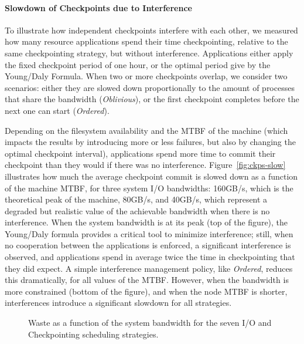 \documentclass[conference,nofonttune]{IEEEtran}
\newcommand{\nocoop}{\emph{Oblivious}\xspace}
\newcommand{\fifoblock}{\emph{Ordered}\xspace}
\begin{document}
\paragraph{Slowdown of Checkpoints due to Interference}
To illustrate how independent checkpoints interfere with each other,
we measured how many resource applications spend their time
checkpointing, relative to the same checkpointing strategy, but
without interference. Applications either apply the fixed checkpoint
period of one hour, or the optimal period give by the Young/Daly
Formula. When two or more checkpoints overlap, we consider two
scenarios: either they are slowed down proportionally to the amount of
processes that share the bandwidth (\nocoop), or the first checkpoint
completes before the next one can start (\fifoblock).

Depending on the filesystem availability and the MTBF of the machine
(which impacts the results by introducing more or less failures, but
also by changing the optimal checkpoint interval), applications spend
more time to commit their checkpoint than they would if there was no
interference. Figure~\ref{fig:ckps-slow} illustrates how much
the average checkpoint commit is slowed down as a function of the
machine MTBF, for three system I/O bandwidths: 160GB/s, which is the
theoretical peak of the machine, 80GB/s, and 40GB/s, which represent a
degraded but realistic value of the achievable bandwidth when there is
no interference.  When the system bandwidth is at its peak
(top of the figure), the Young/Daly formula
provides a critical tool to minimize interference; still, when no
cooperation between the applications is enforced, a significant
interference is observed, and applications spend in average twice the
time in checkpointing that they did expect. A simple interference
management policy, like \fifoblock, reduces this dramatically, for all
values of the MTBF.  However, when the bandwidth is more constrained
(bottom of the figure), and when the node MTBF is
shorter, interferences introduce a significant slowdown for all
strategies.

\begin{figure}
  \begin{center}
    \resizebox{1.05\linewidth}{!}{}
  \end{center}
  \caption{Waste as a function of the system bandwidth for the
    seven I/O and Checkpointing scheduling strategies. \label{fig:cielo-1hmtbf}}
\end{figure}
\end{document}
